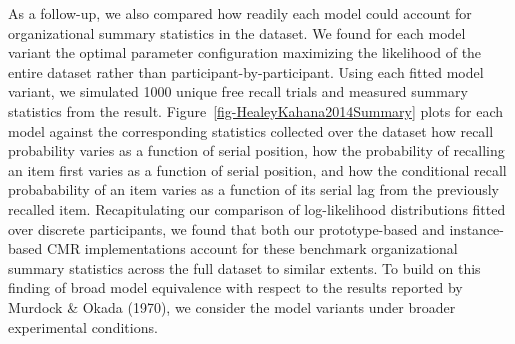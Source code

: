 \documentclass[
  letterpaper,
  DIV=11,
  numbers=noendperiod]{scrreport}
\begin{document}
As a follow-up, we also compared how readily each model could account
for organizational summary statistics in the dataset. We found for each
model variant the optimal parameter configuration maximizing the
likelihood of the entire dataset rather than participant-by-participant.
Using each fitted model variant, we simulated 1000 unique free recall
trials and measured summary statistics from the result.
Figure~\ref{fig-HealeyKahana2014Summary} plots for each model against
the corresponding statistics collected over the dataset how recall
probability varies as a function of serial position, how the probability
of recalling an item first varies as a function of serial position, and
how the conditional recall probabability of an item varies as a function
of its serial lag from the previously recalled item. Recapitulating our
comparison of log-likelihood distributions fitted over discrete
participants, we found that both our prototype-based and instance-based
CMR implementations account for these benchmark organizational summary
statistics across the full dataset to similar extents. To build on this
finding of broad model equivalence with respect to the results reported
by Murdock \& Okada (1970), we consider the model variants under broader
experimental conditions.
\end{document}
